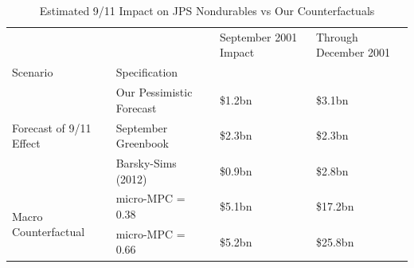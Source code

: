 \begin{table}
\caption{Estimated 9/11 Impact on JPS Nondurables vs Our Counterfactuals}
\begin{tabular}{llll}
\toprule
 &  & September 2001 Impact & Through December 2001 \\
Scenario & Specification &  &  \\
\midrule
\multirow[t]{3}{*}{Forecast of 9/11 Effect} & Our Pessimistic Forecast & \$1.2bn & \$3.1bn \\
 & September Greenbook & \$2.3bn & \$2.3bn \\
 & Barsky-Sims (2012) & \$0.9bn & \$2.8bn \\
\cline{1-4}
\multirow[t]{2}{*}{Macro Counterfactual} & micro-MPC = 0.38 & \$5.1bn & \$17.2bn \\
 & micro-MPC = 0.66 & \$5.2bn & \$25.8bn \\
\cline{1-4}
\bottomrule
\end{tabular}
\end{table}

